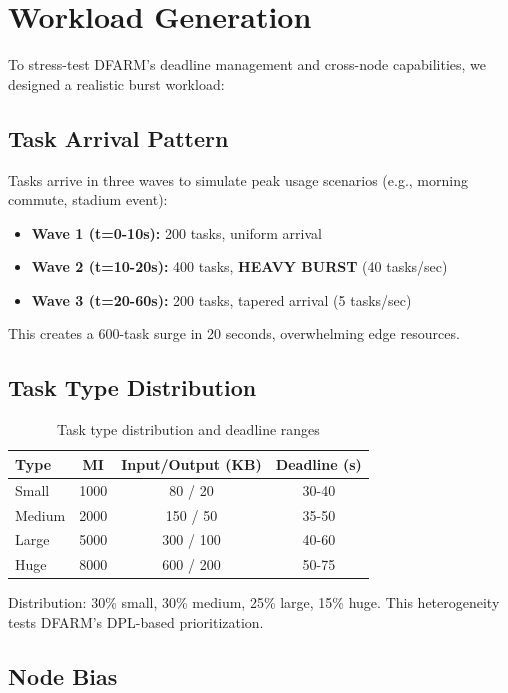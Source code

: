 \documentclass[12pt]{report}
\begin{document}
\section{Workload Generation}

To stress-test DFARM's deadline management and cross-node capabilities, we designed a realistic burst workload:

\subsection{Task Arrival Pattern}

Tasks arrive in three waves to simulate peak usage scenarios (e.g., morning commute, stadium event):

\begin{itemize}
    \item \textbf{Wave 1 (t=0-10s):} 200 tasks, uniform arrival
    \item \textbf{Wave 2 (t=10-20s):} 400 tasks, \textbf{HEAVY BURST} (40 tasks/sec)
    \item \textbf{Wave 3 (t=20-60s):} 200 tasks, tapered arrival (5 tasks/sec)
\end{itemize}

This creates a 600-task surge in 20 seconds, overwhelming edge resources.

\subsection{Task Type Distribution}

\begin{table}[H]
\centering
\caption{Task type distribution and deadline ranges}
\label{tab:task_types}
\begin{tabular}{lccc}
\toprule
\textbf{Type} & \textbf{MI} & \textbf{Input/Output (KB)} & \textbf{Deadline (s)} \\
\midrule
Small & 1000 & 80 / 20 & 30-40 \\
Medium & 2000 & 150 / 50 & 35-50 \\
Large & 5000 & 300 / 100 & 40-60 \\
Huge & 8000 & 600 / 200 & 50-75 \\
\bottomrule
\end{tabular}
\end{table}

Distribution: 30\% small, 30\% medium, 25\% large, 15\% huge. This heterogeneity tests DFARM's DPL-based prioritization.

\subsection{Node Bias}
\end{document}
